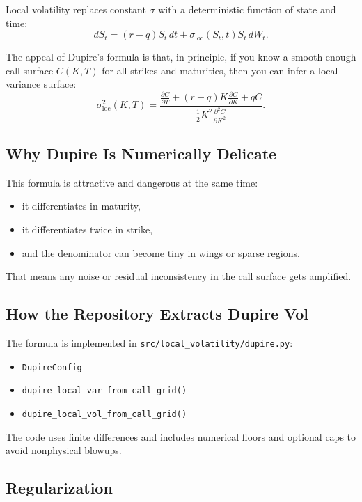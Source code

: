 \documentclass[11pt]{article}
\begin{document}
Local volatility replaces constant $\sigma$ with a deterministic function of state and time:
\[
dS_t = (r-q)S_t\,dt + \sigma_{\text{loc}}(S_t,t) S_t\,dW_t.
\]

The appeal of Dupire's formula is that, in principle, if you know a smooth enough call surface $C(K,T)$ for all strikes and maturities, then you can infer a local variance surface:
\[
\sigma_{\text{loc}}^2(K,T)
=
\frac{
\frac{\partial C}{\partial T}
+(r-q)K\frac{\partial C}{\partial K}
+qC
}{
\tfrac12 K^2 \frac{\partial^2 C}{\partial K^2}
}.
\]

\subsection{Why Dupire Is Numerically Delicate}

This formula is attractive and dangerous at the same time:

\begin{itemize}
  \item it differentiates in maturity,
  \item it differentiates twice in strike,
  \item and the denominator can become tiny in wings or sparse regions.
\end{itemize}

That means any noise or residual inconsistency in the call surface gets amplified.

\subsection{How the Repository Extracts Dupire Vol}

The formula is implemented in \texttt{src/local\_volatility/dupire.py}:

\begin{itemize}
  \item \texttt{DupireConfig}
  \item \texttt{dupire\_local\_var\_from\_call\_grid()}
  \item \texttt{dupire\_local\_vol\_from\_call\_grid()}
\end{itemize}

The code uses finite differences and includes numerical floors and optional caps to avoid nonphysical blowups.

\subsection{Regularization}
\end{document}
